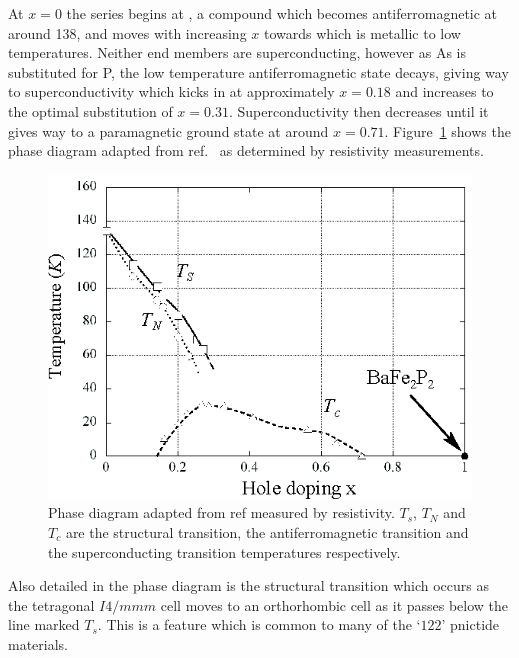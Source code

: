 At $x=0$ the \BaFePAs series begins at \BaFeAs, a compound which becomes antiferromagnetic at around \unit{138}{\kelvin}, and moves with increasing $x$ towards \BaFeP which is metallic to low temperatures. Neither end members are superconducting, however as As is substituted for P, the low temperature antiferromagnetic state decays, giving way to superconductivity which kicks in at approximately $x=0.18$ and increases to the optimal substitution of $x=0.31$. Superconductivity then decreases until it gives way to a paramagnetic ground state at around $x=0.71$. Figure~\ref{Fig:Intro:PhaseDiagram} shows the phase diagram adapted from ref.~\cite{Nakai2010a} as determined by resistivity measurements. 
\begin{figure}[htbp]
    \begin{center}
        \includegraphics[scale=1.0]{Chapter-Introduction/Figures/PhaseDiagram/PhaseDiagram}
        \caption{Phase diagram adapted from ref \cite{Nakai2010a} measured by resistivity. $T_s$, $T_N$ and $T_c$ are the structural transition, the antiferromagnetic transition and the superconducting transition temperatures respectively.}
        \label{Fig:Intro:PhaseDiagram}
    \end{center}
\end{figure}
Also detailed in the phase diagram is the structural transition which occurs as the tetragonal $I4/mmm$ cell moves to an orthorhombic cell as it passes below the line marked $T_s$. This is a feature which is common to many of the `$122$' pnictide materials.


